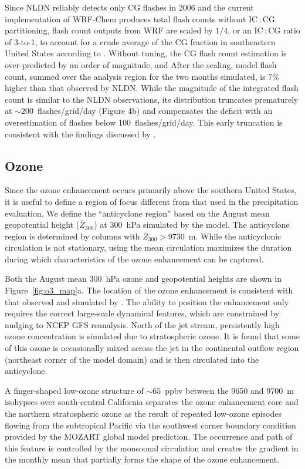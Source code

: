 Since NLDN reliably detects only CG flashes in 2006 and the current implementation of
WRF-Chem produces total flash counts without IC\,:\,CG partitioning, flash count outputs
from WRF are scaled by $1/4$, or an IC\,:\,CG ratio of 3-to-1, to account for a crude average
of the CG fraction in southeastern United States according to \citet{Boccippio:2001ys}.
Without tuning, the CG flash count estimation is over-predicted by an order of magnitude, and
After the scaling, model flash count, summed over the analysis region for the two months simulated,
is 7\% higher than that observed by NLDN.
While the magnitude of the integrated flash count is similar to the NLDN observations,
its distribution truncates prematurely at $\sim200$~flashes/grid/day (Figure 4b) and compensates 
the deficit with an overestimation of flashes below
100~flashes/grid/day. This early truncation is consistent with the findings discussed by
\citet{Wong:2013vn}.

\subsection{Ozone}\label{sect:val/o3}

Since the ozone enhancement occurs primarily above the southern United States, it is
useful to define a region of focus different from that used in the precipitation evaluation.
We define the ``anticyclone region'' based on the August mean geopotential height
($\overline Z_{300}$) at 300~hPa simulated by the model. The anticyclone region is determined
by columns with $\overline Z_{300}>9730$~m. While the anticyclonic circulation is not stationary, using
the mean circulation maximizes the duration during which characteristics of the ozone
enhancement can be captured.

Both the August mean 300~hPa ozone and geopotential heights are shown in
Figure~\ref{fig:o3_map}a. The
location of the ozone enhancement is consistent with that observed and simulated by
\citet{Cooper:2007cr}. The ability to position the enhancement only requires the correct
large-scale dynamical features, which are constrained by nudging to NCEP GFS reanalysis.
North of the jet stream, persistently high ozone
concentration is simulated due to stratospheric ozone. It is found that some of this
ozone is occasionally mixed across the jet in the continental outflow region (northeast
corner of the model domain) and is then circulated into the anticyclone.

A finger-shaped low-ozone structure of $\sim65$~ppbv between the 9650
and 9700~m isohypses over south-central California separates the ozone enhancement
core and the northern stratospheric ozone as the result of repeated
low-ozone episodes flowing from the subtropical Pacific via the southwest corner boundary condition
provided by the MOZART global model prediction. The occurrence and path of this feature is controlled
by the monsoonal circulation and creates the gradient in the monthly mean that
partially forms the shape of the ozone enhancement.

